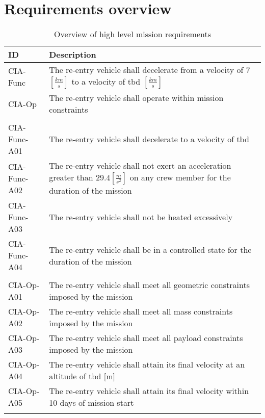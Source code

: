 \section{Requirements overview} \label{app:req}

\begin{table}[H]
	\caption*{Overview of high level mission requirements} \label{tab:toplevelreq}
	\begin{tabular}{|p{}|p{}|}
    \hline
    ID          & Description                                                                                                      \\ \hline \hline
    CIA-Func & The re-entry vehicle shall decelerate from a velocity of 7 $[\frac{km}{s}]$ to a velocity of \gls{tbd} $[\frac{km}{s}]$  \\ \hline
    CIA-Op & The re-entry vehicle shall operate within mission constraints                                               \\ \hline
& \\ \hline
    CIA-Func-A01 & The re-entry vehicle shall decelerate to a velocity of \gls{tbd}     \\ \hline
    CIA-Func-A02 & The re-entry vehicle shall not exert an acceleration greater than $29.4 [\frac{m}{s^2}]$ on any crew member for the duration of the mission			\\ \hline
    CIA-Func-A03 & The re-entry vehicle shall not be heated excessively  \\ \hline
    CIA-Func-A04 & The re-entry vehicle shall be in a controlled state for the duration of the mission                            \\ \hline
& \\ \hline
    CIA-Op-A01 & The re-entry vehicle shall meet all geometric constraints imposed by the mission                           \\ \hline
    CIA-Op-A02 & The re-entry vehicle shall meet all mass constraints imposed by the mission                                      \\ \hline
	CIA-Op-A03 & The re-entry vehicle shall meet all payload constraints imposed by the mission \\ \hline
	CIA-Op-A04 & The re-entry vehicle shall attain its final velocity at an altitude of \gls{tbd} [m] \\ \hline
	CIA-Op-A05 & The re-entry vehicle shall attain its final velocity within 10 days of mission start \\ \hline
& \\ \hline

\end{tabular}
\end{table}
